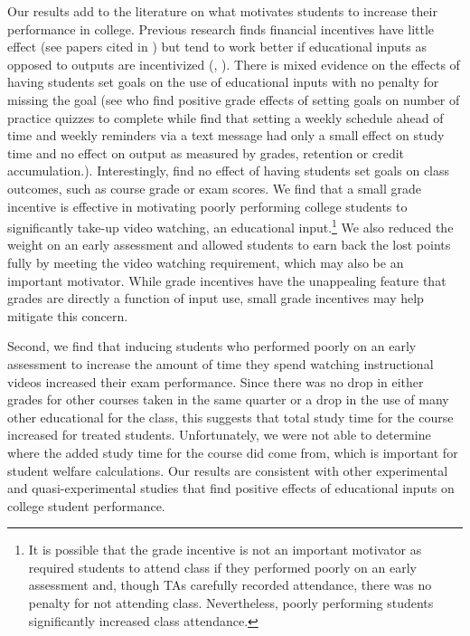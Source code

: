 \documentclass[12pt]{article}
\begin{document}
Our results add to the literature on what motivates students to increase their performance in college. Previous research finds financial incentives have little effect (see papers cited in \textcite{gmr2011}) but tend to work better if educational inputs as opposed to outputs are incentivized (\textcite{fryer2011}, \textcite{gmr2011}). There is mixed evidence on the effects of having students set goals on the use of educational inputs with no penalty for missing the goal (see \textcite{cgpr2020} who find positive grade effects of setting goals on number of practice quizzes to complete while \textcite{oppp2019} find that setting a weekly schedule ahead of time and weekly reminders via a text message had only a small effect on study time and no effect on output as measured by grades, retention or credit accumulation.). Interestingly, \textcite{cgpr2020} find no effect of having students set goals on class outcomes, such as course grade or exam scores. We find that a small grade incentive is effective in motivating poorly performing college students to significantly take-up video watching, an educational input.\footnote{It is possible that the grade incentive is not an important motivator as \textcite{dgm2010} required students to attend class if they performed poorly on an early assessment and, though TAs carefully recorded attendance, there was no penalty for not attending class. Nevertheless, poorly performing students significantly increased class attendance.} We also reduced the weight on an early assessment and allowed students to earn back the lost points fully by meeting the video watching requirement, which may also be an important motivator. While grade incentives have the unappealing feature that grades are directly a function of input use, small grade incentives may help mitigate this concern.

Second, we find that inducing students who performed poorly on an early assessment to increase the amount of time they spend watching instructional videos increased their exam performance. Since there was no drop in either grades for other courses taken in the same quarter or a drop in the use of many other educational for the class, this suggests that total study time for the course increased for treated students. Unfortunately, we were not able to determine where the added study time for the course did come from, which is important for student welfare calculations. Our results are consistent with other experimental and quasi-experimental studies that find positive effects of educational inputs on college student performance. %
\end{document}
